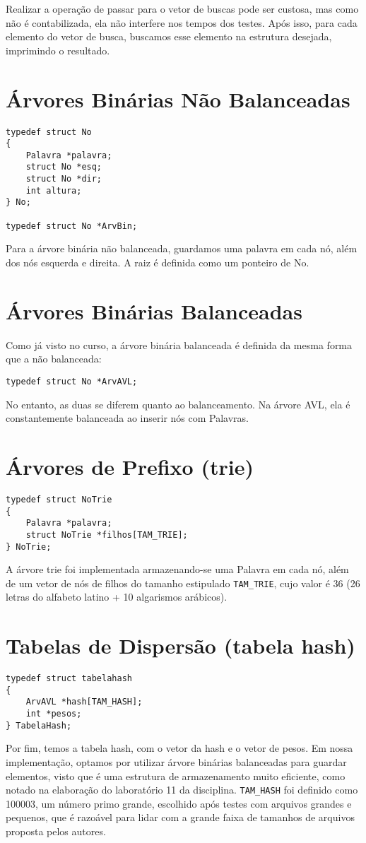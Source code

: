 Realizar a operação de passar para o vetor de buscas pode ser custosa, mas como não é contabilizada, ela não interfere nos tempos dos testes. Após isso, para cada elemento do vetor de busca, buscamos esse elemento na estrutura desejada, imprimindo o resultado.
\section{Árvores Binárias Não Balanceadas}\label{tadArvBin}
\begin{lstlisting}
typedef struct No
{
    Palavra *palavra;
    struct No *esq;
    struct No *dir;
    int altura;
} No;

typedef struct No *ArvBin;
\end{lstlisting}

Para a árvore binária não balanceada, guardamos uma palavra em cada nó, além dos nós esquerda e direita. A raiz é definida como um ponteiro de No.

\section{Árvores Binárias Balanceadas}\label{tadAVL}
Como já visto no curso, a árvore binária balanceada é definida da mesma forma que a não balanceada:
\begin{lstlisting}
typedef struct No *ArvAVL;
\end{lstlisting}

No entanto, as duas se diferem quanto ao balanceamento. Na árvore AVL, ela é constantemente balanceada ao inserir nós com Palavras.

\section{Árvores de Prefixo (trie)}\label{tadTrie}
\begin{lstlisting}
typedef struct NoTrie
{
    Palavra *palavra;
    struct NoTrie *filhos[TAM_TRIE];
} NoTrie;
\end{lstlisting}

A árvore trie foi implementada armazenando-se uma Palavra em cada nó, além de um vetor de nós de filhos do tamanho estipulado \texttt{TAM\_TRIE}, cujo valor é 36 (26 letras do alfabeto latino + 10 algarismos arábicos).


\section{Tabelas de Dispersão (tabela hash)}
\begin{lstlisting}
typedef struct tabelahash
{
    ArvAVL *hash[TAM_HASH];
    int *pesos;
} TabelaHash;
\end{lstlisting}
Por fim, temos a tabela hash, com o vetor da hash e o vetor de pesos. Em nossa implementação, optamos por utilizar árvore binárias balanceadas para guardar elementos, visto que é uma estrutura de armazenamento muito eficiente, como notado na elaboração do laboratório 11 da disciplina. \texttt{TAM\_HASH} foi definido como 100003, um número primo grande, escolhido após testes com arquivos grandes e pequenos, que é razoável para lidar com a grande faixa de tamanhos de arquivos proposta pelos autores.

